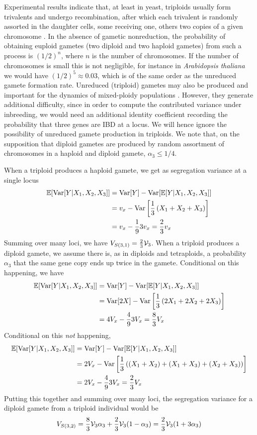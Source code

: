 \documentclass[11pt,a4paper]{article}
\begin{document}
Experimental results indicate that, at least in yeast, triploids usually form
trivalents and undergo recombination, after which each trivalent is randomly
assorted in the daughter cells, some receiving one, others two copies of a
given chromosome \citep{charles2010}.
In the absence of gametic nonreduction, the probability
of obtaining euploid gametes (two diploid and two haploid gametes) from such 
a process is $(1/2)^n$, where $n$ is the number of chromosomes. If the number
of chromosomes is small this is not negligible, for instance in
\textit{Arabidopsis thaliana} we would have $(1/2)^5 \approx 0.03$, which is of
the same order as the unreduced gamete formation rate.
Unreduced (triploid) gametes may also be produced and important for the
dynamics of mixed-ploidy populations \citep{ramsey1998}.
However, they generate additional difficulty, since in order to compute the
contributed variance under inbreeding, we would need an additional identity
coefficient recording the probability that three genes are IBD at a locus.
We will hence ignore the possibility of unreduced gamete production in
triploids.
We note that, on the supposition that diploid gametes are produced by random
assortment of chromosomes in a haploid and diploid gamete, $\alpha_3 \le 1/4$.

When a triploid produces a haploid gamete, we get as segregation variance at a
single locus
\begin{align*}
  \mathbb{E}[\mathrm{Var}[Y|X_1,X_2,X_3]] &= \mathrm{Var}[Y] - \mathrm{Var}[\mathbb{E}[Y|X_1,X_2,X_3]] \\
    &= v_x - \mathrm{Var}\left[\frac{1}{3}\left(X_1 + X_2 + X_3\right)\right] \\ 
    &= v_x - \frac{1}{9}3v_x = \frac{2}{3}v_x
\end{align*}
Summing over many loci, we have $V_{S(3,1)} = \frac{2}{3}\mathcal{V}_{3}$.
When a triploid produces a diploid gamete, we assume there is, as in diploids
and tetraploids, a probability $\alpha_3$ that the same gene copy ends up twice
in the gamete.
Conditional on this happening, we have
\begin{align*}
  \mathbb{E}[\mathrm{Var}[Y|X_1,X_2,X_3]] &= \mathrm{Var}[Y] - \mathrm{Var}[\mathbb{E}[Y|X_1,X_2,X_3]] \\
    &= \mathrm{Var}[2X] - \mathrm{Var}\left[\frac{1}{3}\left(2X_1 + 2X_2 + 2X_3\right)\right] \\
    &= 4V_x - \frac{4}{9}3V_x = \frac{8}{3}V_x
\end{align*}
Conditional on this \textit{not} happening, 
\begin{align*}
  \mathbb{E}[\mathrm{Var}[Y|X_1,X_2,X_3]] &= \mathrm{Var}[Y] - \mathrm{Var}[\mathbb{E}[Y|X_1,X_2,X_3]] \\
    &= 2V_x - \mathrm{Var}\left[\frac{1}{3}\left((X_1+X_2) + (X_1+X_3) +
      (X_2+X_3)\right)\right] \\
    &= 2V_x - \frac{4}{9}3V_x = \frac{2}{3}V_x
\end{align*} 
Putting this together and summing over many loci, the segregation variance for
a diploid gamete from a triploid individual would be
  $$V_{S(3,2)} = \frac{8}{3}\mathcal{V}_{3}\alpha_3 + \frac{2}{3}\mathcal{V}_{3} (1-\alpha_3) 
            = \frac{2}{3}\mathcal{V}_{3}(1 + 3\alpha_3)$$ 
\end{document}

